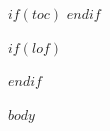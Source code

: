 \documentclass[a4paper,12pt]{report}
\begin{document}
$if(toc)$
\newpage
\tableofcontents
$endif$

$if(lof)$
\newpage
\listoffigures
{}
$endif$

$body$
\end{document}
